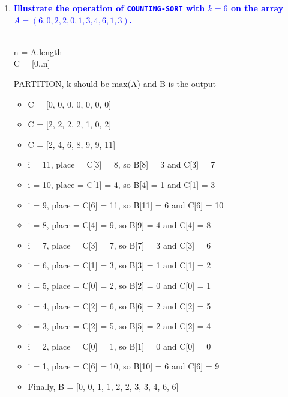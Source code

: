 \documentclass[11pt]{article}
\begin{document}
\begin{enumerate}
\item \textbf{\textcolor{blue}{Illustrate the operation of {\tt COUNTING-SORT} with $k=6$ on
the array $A=(6,0,2,2,0,1,3,4,6,1,3)$.}}
    \\
    \begin{algorithm}[H]
        \Indm{} \\
        \Indp
            n = A.length \\
            C = [0..n] \\
        \caption{PARTITION, k should be max(A) and B is the output}
    \end{algorithm}
    \begin{itemize}
        \item C = [0, 0, 0, 0, 0, 0, 0]
        \item C = [2, 2, 2, 2, 1, 0, 2]
        \item C = [2, 4, 6, 8, 9, 9, 11]
        \item i = 11, place = C[3] = 8, so B[8] = 3 and C[3] = 7
        \item i = 10, place = C[1] = 4, so B[4] = 1 and C[1] = 3
        \item i = 9, place = C[6] = 11, so B[11] = 6 and C[6] = 10
        \item i = 8, place = C[4] = 9, so B[9] = 4 and C[4] = 8
        \item i = 7, place = C[3] = 7, so B[7] = 3 and C[3] = 6
        \item i = 6, place = C[1] = 3, so B[3] = 1 and C[1] = 2
        \item i = 5, place = C[0] = 2, so B[2] = 0 and C[0] = 1
        \item i = 4, place = C[2] = 6, so B[6] = 2 and C[2] = 5
        \item i = 3, place = C[2] = 5, so B[5] = 2 and C[2] = 4
        \item i = 2, place = C[0] = 1, so B[1] = 0 and C[0] = 0
        \item i = 1, place = C[6] = 10, so B[10] = 6 and C[6] = 9
        \item Finally, B = [0, 0, 1, 1, 2, 2, 3, 3, 4, 6, 6]
    \end{itemize}
    

\end{enumerate}
\end{document}
